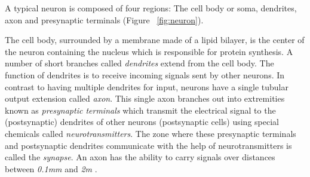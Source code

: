\documentclass[12pt]{article}
\numberwithin{equation}{section}
\numberwithin{figure}{section}
\numberwithin{table}{section}
\begin{document}
\par{
    A typical neuron is composed of four regions: The cell body or soma, dendrites, axon
    and presynaptic terminals (Figure ~\ref{fig:neuron}).
}
\par{
    The cell body, surrounded by a membrane made of a lipid bilayer, is the center
    of the neuron containing the nucleus which is responsible for protein synthesis.
    A number of short branches called \emph{dendrites} extend from the cell body. The function
    of dendrites is to receive incoming signals sent by other neurons. In contrast to having
    multiple dendrites for input, neurons have a single tubular output extension called \emph{axon}.
    This single axon branches out into extremities known as \emph{presynaptic terminals} which
    transmit the electrical signal to the (postsynaptic) dendrites of other neurons (postsynaptic cells)
    using special chemicals called \emph{neurotransmitters}. The zone where these presynaptic terminals
    and postsynaptic dendrites communicate with the help of neurotransmitters is called the \emph{synapse}.
    An axon has the ability to carry signals over distances
    between \emph{0.1mm} and \emph{2m} \citep{kandel_principles_2013}.
}
\end{document}
